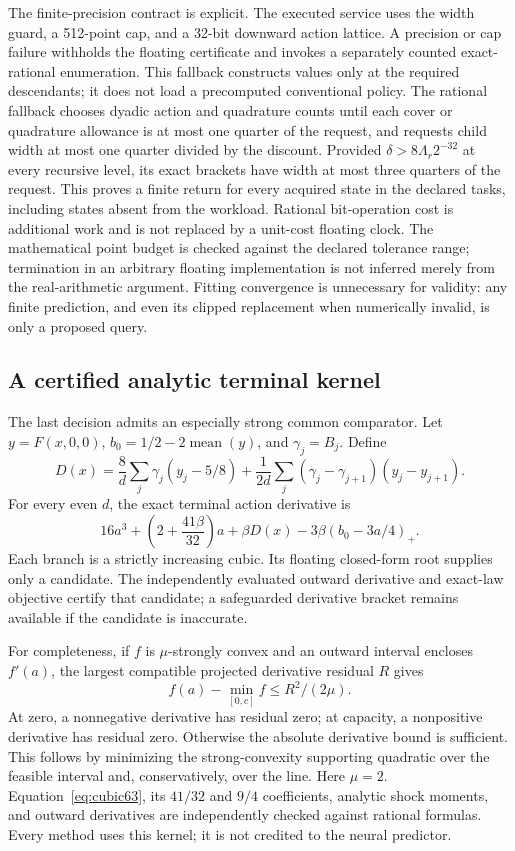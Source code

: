 The finite-precision contract is explicit. The executed service uses the width guard, a 512-point cap, and a 32-bit downward action lattice. A precision or cap failure withholds the floating certificate and invokes a separately counted exact-rational enumeration. This fallback constructs values only at the required descendants; it does not load a precomputed conventional policy. The rational fallback chooses dyadic action and quadrature counts until each cover or quadrature allowance is at most one quarter of the request, and requests child width at most one quarter divided by the discount. Provided $\delta>8\Lambda_r2^{-32}$ at every recursive level, its exact brackets have width at most three quarters of the request. This proves a finite return for every acquired state in the declared tasks, including states absent from the workload. Rational bit-operation cost is additional work and is not replaced by a unit-cost floating clock. The mathematical point budget is checked against the declared tolerance range; termination in an arbitrary floating implementation is not inferred merely from the real-arithmetic argument. Fitting convergence is unnecessary for validity: any finite prediction, and even its clipped replacement when numerically invalid, is only a proposed query.

\subsection{A certified analytic terminal kernel}
The last decision admits an especially strong common comparator. Let $y=F(x,0,0)$, $b_0=1/2-2\operatorname{mean}(y)$, and $\gamma_j=B_j$. Define
\[
 D(x)=\frac8d\sum_j\gamma_j(y_j-5/8)
   +\frac1{2d}\sum_j(\gamma_j-\gamma_{j+1})(y_j-y_{j+1}).
\]
For every even $d$, the exact terminal action derivative is
\begin{equation}\label{eq:cubic63}
 16a^3+\left(2+\frac{41\beta}{32}\right)a
 +\beta D(x)-3\beta(b_0-3a/4)_+.
\end{equation}
Each branch is a strictly increasing cubic. Its floating closed-form root supplies only a candidate. The independently evaluated outward derivative and exact-law objective certify that candidate; a safeguarded derivative bracket remains available if the candidate is inaccurate.

For completeness, if $f$ is $\mu$-strongly convex and an outward interval encloses $f'(a)$, the largest compatible projected derivative residual $R$ gives
\[
 f(a)-\min_{[0,c]}f\le R^2/(2\mu).
\]
At zero, a nonnegative derivative has residual zero; at capacity, a nonpositive derivative has residual zero. Otherwise the absolute derivative bound is sufficient. This follows by minimizing the strong-convexity supporting quadratic over the feasible interval and, conservatively, over the line. Here $\mu=2$. Equation~\eqref{eq:cubic63}, its $41/32$ and $9/4$ coefficients, analytic shock moments, and outward derivatives are independently checked against rational formulas. Every method uses this kernel; it is not credited to the neural predictor.

